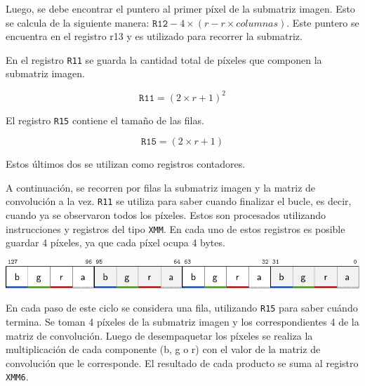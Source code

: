         Luego, se debe encontrar el puntero al primer píxel de la submatriz imagen. Esto se calcula de la siguiente manera: $\mathtt{R12} - 4 \times (r - r \times columnas)$. Este puntero se encuentra en el registro r13 y es utilizado para recorrer la submatriz. 

        En el registro \texttt{R11} se guarda la cantidad total de píxeles que componen la submatriz imagen. 

          \[ \mathtt{R11} = (2 \times r + 1)^{2} \]
        
        El registro \texttt{R15} contiene el tamaño de las filas.
        
          \[ \mathtt{R15} = (2 \times r + 1) \]

        Estos últimos dos se utilizan como registros contadores.

        A continuación, se recorren por filas la submatriz imagen y la matriz de convolución a la vez. \texttt{R11} se utiliza para saber cuando finalizar el bucle, es decir, cuando ya se observaron todos los píxeles. Estos son procesados utilizando instrucciones  y registros del tipo \texttt{XMM}. En cada uno de estos registros es posible guardar 4 píxeles, ya que cada píxel ocupa 4 bytes. 

        \begin{center}
           \includegraphics{imagenes/blur-registros-1.pdf}
        \end{center}
  
        En cada paso de este ciclo se considera una fila, utilizando \texttt{R15} para saber cuándo termina. Se toman 4 píxeles de la submatriz imagen y los correspondientes 4 de la matriz de convolución. Luego de desempaquetar los píxeles se realiza la multiplicación de cada componente (\textsf{b}, \textsf{g} o \textsf{r}) con el valor de la matriz de convolución que le corresponde. El resultado de cada producto se suma al registro \texttt{XMM6}. 

        \vspace{\baselineskip}

